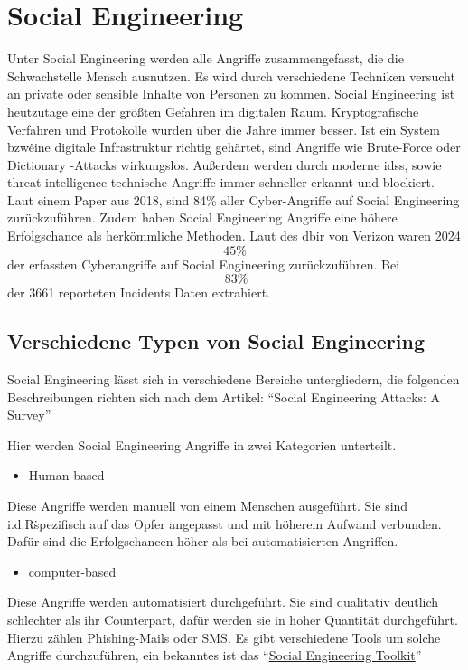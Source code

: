 \section{Social Engineering}\label{sec:social_engineering}
Unter Social Engineering werden alle Angriffe zusammengefasst, die die Schwachstelle Mensch ausnutzen.
Es wird durch verschiedene Techniken versucht an private oder sensible Inhalte von Personen zu kommen.
Social Engineering ist heutzutage eine der größten Gefahren im digitalen Raum.
Kryptografische Verfahren und Protokolle wurden über die Jahre immer besser.
Ist ein System bzw\. eine digitale Infrastruktur richtig gehärtet, sind Angriffe wie Brute-Force oder Dictionary
-Attacks wirkungslos.
Außerdem werden durch moderne \glspl{ids}, sowie \gls{threat-intelligence} technische Angriffe immer schneller
erkannt und blockiert.
Laut einem Paper aus 2018, sind 84\% aller Cyber-Angriffe auf Social Engineering zurückzuführen.
Zudem haben Social Engineering Angriffe eine höhere Erfolgschance als herkömmliche Methoden.
Laut des \gls{dbir} von Verizon waren 2024 \[45\%\] der erfassten Cyberangriffe auf Social Engineering zurückzuführen.
Bei \[~83\%\] der 3661 reporteten Incidents Daten extrahiert.\cite{verizon-2024-dbir}

\subsection{Verschiedene Typen von Social Engineering}\label{subsec:verschiedene-typen-von-social-engineering}
Social Engineering lässt sich in verschiedene Bereiche untergliedern, die folgenden Beschreibungen richten sich nach
dem Artikel: ``Social Engineering Attacks: A Survey''\cite{social-engineering-a-survey}

Hier werden Social Engineering Angriffe in zwei Kategorien unterteilt.
\begin{itemize}
    \item Human-based
\end{itemize}
    Diese Angriffe werden manuell von einem Menschen ausgeführt.
    Sie sind i.d.R\. spezifisch auf das Opfer angepasst und mit höherem Aufwand verbunden.
    Dafür sind die Erfolgschancen höher als bei automatisierten Angriffen.
\begin{itemize}
    \item computer-based
\end{itemize}
Diese Angriffe werden automatisiert durchgeführt.
Sie sind qualitativ deutlich schlechter als ihr Counterpart, dafür werden sie in hoher Quantität durchgeführt.
Hierzu zählen Phishing-Mails oder SMS\@.
Es gibt verschiedene Tools um solche Angriffe durchzuführen, ein bekanntes ist das ``\href{https://github.com/trustedsec/social-engineer-toolkit}{Social Engineering Toolkit}''

